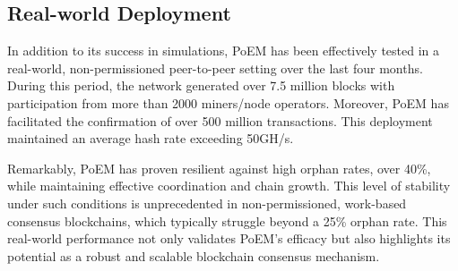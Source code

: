 \subsection{Real-world Deployment} 
In addition to
its success in simulations, PoEM has been effectively tested in a real-world,
non-permissioned peer-to-peer setting over the last four months. During this
period, the network generated over 7.5 million blocks with participation from
more than 2000 miners/node operators. Moreover, PoEM has facilitated the
confirmation of over 500 million transactions. This deployment maintained an
average hash rate exceeding 50GH/s.

Remarkably, PoEM has proven resilient against high orphan rates, over 40\%,
while maintaining effective coordination and chain growth. This level of
stability under such conditions is unprecedented in non-permissioned,
work-based consensus blockchains, which typically struggle beyond a 25\% orphan
rate. This real-world performance not only validates PoEM's efficacy but also
highlights its potential as a robust and scalable blockchain consensus
mechanism.
